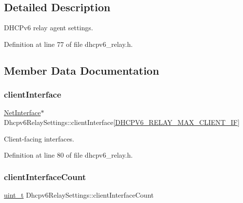\subsection{Detailed Description}
D\+H\+C\+Pv6 relay agent settings. 

Definition at line 77 of file dhcpv6\+\_\+relay.\+h.



\subsection{Member Data Documentation}
\mbox{\label{structDhcpv6RelaySettings_a4241ac47ff555d8eec259b14eb51e3b9}} 
\subsubsection{\texorpdfstring{client\+Interface}{clientInterface}}
{\footnotesize\ttfamily \hyperlink{net_8h_a2234db8911a1148c9159979d8f5e0d6b}{Net\+Interface}$\ast$ Dhcpv6\+Relay\+Settings\+::client\+Interface\mbox{[}\hyperlink{dhcpv6__relay_8h_a588f9db9b4638a3b196e1421ab1bf6dc}{D\+H\+C\+P\+V6\+\_\+\+R\+E\+L\+A\+Y\+\_\+\+M\+A\+X\+\_\+\+C\+L\+I\+E\+N\+T\+\_\+\+IF}\mbox{]}}



Client-\/facing interfaces. 



Definition at line 80 of file dhcpv6\+\_\+relay.\+h.

\mbox{\label{structDhcpv6RelaySettings_a71332729d2fd110fdb43069bbe8675b5}} 
\subsubsection{\texorpdfstring{client\+Interface\+Count}{clientInterfaceCount}}
{\footnotesize\ttfamily \hyperlink{compiler__port_8h_a12a1e9b3ce141648783a82445d02b58d}{uint\+\_\+t} Dhcpv6\+Relay\+Settings\+::client\+Interface\+Count}



